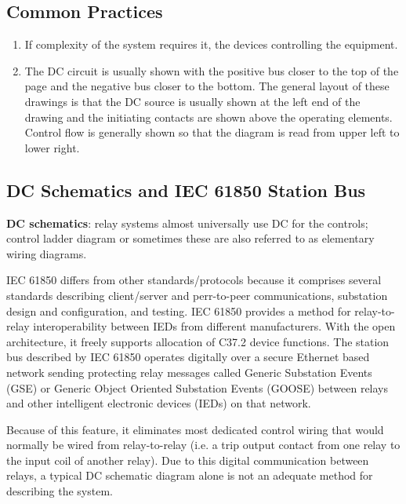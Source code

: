 \subsection{Common Practices}
\begin{enumerate}
    \item If complexity of the system requires it, the devices controlling the equipment.
    \item The DC circuit is usually shown with the positive bus closer to the top of the page and the negative bus closer to the bottom. The general layout of these drawings is that the DC source is usually shown at the left end of the drawing and the initiating contacts are shown above the operating elements. Control flow is generally shown so that the diagram is read from upper left to lower right.
\end{enumerate}

\subsection{DC Schematics and IEC 61850 Station Bus}
\textbf{DC schematics}: relay systems almost universally use DC for the controls; control ladder diagram or sometimes these are also referred to as elementary wiring diagrams.

IEC 61850 differs from other standards/protocols because it comprises several standards describing client/server and perr-to-peer communications, substation design and configuration, and testing. IEC 61850 provides a method for relay-to-relay interoperability between IEDs from different manufacturers. With the open architecture, it freely supports allocation of C37.2 device functions. The station bus described by IEC 61850 operates digitally over a secure Ethernet based network sending protecting relay messages called Generic Substation Events (GSE) or Generic Object Oriented Substation Events (GOOSE) between relays and other intelligent electronic devices (IEDs) on that network.

Because of this feature, it eliminates most dedicated control wiring that would normally be wired from relay-to-relay (i.e. a trip output contact from one relay to the input coil of another relay). Due to this digital communication between relays, a typical DC schematic diagram alone is not an adequate method for describing the system.

